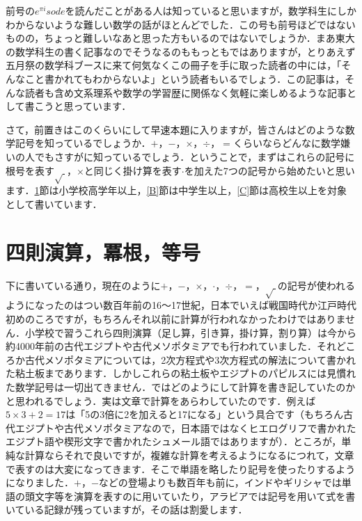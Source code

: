 \documentclass[./main]{subfile}
\begin{document}

前号の$e^{\pi i}sode$を読んだことがある人は知っていると思いますが，数学科生にしかわからないような難しい数学の話がほとんどでした．この号も前号ほどではないものの，ちょっと難しいなあと思った方もいるのではないでしょうか．まあ東大の数学科生の書く記事なのでそうなるのももっともではありますが，とりあえず五月祭の数学科ブースに来て何気なくこの冊子を手に取った読者の中には，「そんなこと書かれてもわからないよ」という読者もいるでしょう．この記事は，そんな読者も含め文系理系や数学の学習歴に関係なく気軽に楽しめるような記事として書こうと思っています．

さて，前置きはこのくらいにして早速本題に入りますが，皆さんはどのような数学記号を知っているでしょうか．$+$，$-$，$\times$，$\div$，$=$くらいならどんなに数学嫌いの人でもさすがに知っているでしょう．ということで，まずはこれらの記号に根号を表す$\sqrt{\ }$，$\times$と同じく掛け算を表す$\cdot$を加えた7つの記号から始めたいと思います．\ref{A}節は小学校高学年以上，\ref{B}節は中学生以上，\ref{C}節は高校生以上を対象として書いています．

\section{四則演算，冪根，等号}\label{A}
下に書いている通り，現在のように$+$，$-$，$\times$，$\cdot$，$\div$，$=$，$\sqrt{\ }$の記号が使われるようになったのはつい数百年前の16～17世紀，日本でいえば戦国時代か江戸時代初めのころですが，もちろんそれ以前に計算が行われなかったわけではありません．小学校で習うこれら四則演算（足し算，引き算，掛け算，割り算）は今から約4000年前の古代エジプトや古代メソポタミアでも行われていました．それどころか古代メソポタミアについては，2次方程式や3次方程式の解法について書かれた粘土板まであります．しかしこれらの粘土板やエジプトのパピルスには見慣れた数学記号は一切出てきません．ではどのようにして計算を書き記していたのかと思われるでしょう．実は文章で計算をあらわしていたのです．例えば$5\times 3+2=17$は「5の3倍に2を加えると17になる」という具合です（もちろん古代エジプトや古代メソポタミアなので，日本語ではなくヒエログリフで書かれたエジプト語や楔形文字で書かれたシュメール語ではありますが）．ところが，単純な計算ならそれで良いですが，複雑な計算を考えるようになるにつれて，文章で表すのは大変になってきます．そこで単語を略したり記号を使ったりするようになりました．$+$，$-$などの登場よりも数百年も前に，インドやギリシャでは単語の頭文字等を演算を表すのに用いていたり，アラビアでは記号を用いて式を書いている記録が残っていますが，その話は割愛します．
\end{document}
